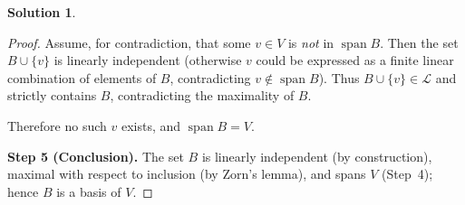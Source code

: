 \documentclass[12pt]{article}
\theoremstyle{definition} %
\newtheorem{solution}{Solution}
\theoremstyle{plain} %
\begin{document}
\begin{solution}
\begin{proof}
      Assume, for contradiction, that some \(v\in V\) is
      \emph{not} in \(\operatorname{span} B\).
      Then the set \(B\cup\{v\}\) is linearly independent
      (otherwise \(v\) could be expressed as a finite linear combination of
      elements of \(B\), contradicting \(v\notin\operatorname{span}B\)).
      Thus \(B\cup\{v\}\in\mathcal L\) and strictly contains \(B\),
      contradicting the maximality of \(B\).
      
      Therefore no such \(v\) exists, and \(\operatorname{span} B = V\).
      
      \bigskip
      \textbf{Step 5 (Conclusion).}
      The set \(B\) is linearly independent (by construction),
      maximal with respect to inclusion (by Zorn’s lemma),
      and spans \(V\) (Step~4);
      hence \(B\) is a basis of \(V\).
      \end{proof} 
  \end{solution}

 
\end{document}
